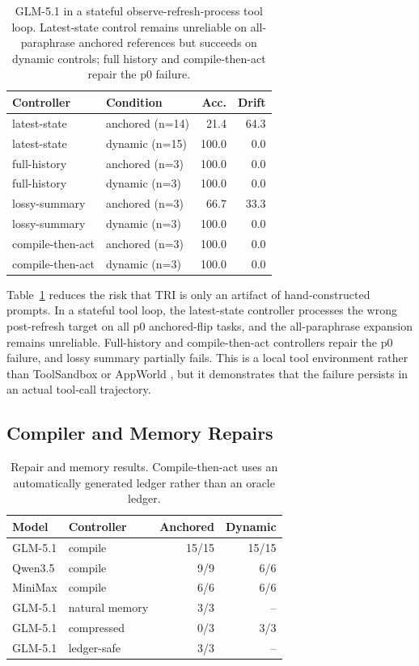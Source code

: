\documentclass[letterpaper]{article}
\begin{document}
\begin{table}[t]
\centering
\small
\begin{tabular}{llrr}
\toprule
Controller & Condition & Acc. & Drift \\
\midrule
latest-state & anchored (n=14) & 21.4 & 64.3 \\
latest-state & dynamic (n=15) & 100.0 & 0.0 \\
full-history & anchored (n=3) & 100.0 & 0.0 \\
full-history & dynamic (n=3) & 100.0 & 0.0 \\
lossy-summary & anchored (n=3) & 66.7 & 33.3 \\
lossy-summary & dynamic (n=3) & 100.0 & 0.0 \\
compile-then-act & anchored (n=3) & 100.0 & 0.0 \\
compile-then-act & dynamic (n=3) & 100.0 & 0.0 \\
\bottomrule
\end{tabular}
\caption{GLM-5.1 in a stateful observe-refresh-process tool loop. Latest-state control remains unreliable on all-paraphrase anchored references but succeeds on dynamic controls; full history and compile-then-act repair the p0 failure.}
\label{tab:tool}
\end{table}

Table~\ref{tab:tool} reduces the risk that TRI is only an artifact of hand-constructed prompts. In a stateful tool loop, the latest-state controller processes the wrong post-refresh target on all p0 anchored-flip tasks, and the all-paraphrase expansion remains unreliable. Full-history and compile-then-act controllers repair the p0 failure, and lossy summary partially fails. This is a local tool environment rather than ToolSandbox or AppWorld \cite{lu2024toolsandbox,trivedi2024appworld}, but it demonstrates that the failure persists in an actual tool-call trajectory.

\subsection{Compiler and Memory Repairs}

\begin{table}[t]
\centering
\small
\begin{tabular}{llrr}
\toprule
Model & Controller & Anchored & Dynamic \\
\midrule
GLM-5.1 & compile & 15/15 & 15/15 \\
Qwen3.5 & compile & 9/9 & 6/6 \\
MiniMax & compile & 6/6 & 6/6 \\
GLM-5.1 & natural memory & 3/3 & -- \\
GLM-5.1 & compressed & 0/3 & 3/3 \\
GLM-5.1 & ledger-safe & 3/3 & -- \\
\bottomrule
\end{tabular}
\caption{Repair and memory results. Compile-then-act uses an automatically generated ledger rather than an oracle ledger.}
\label{tab:repair}
\end{table}
\end{document}
